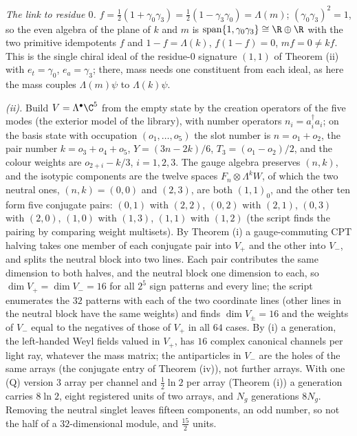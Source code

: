 \emph{The link to residue $0$.} $f = \tfrac12(1 + \gamma_{0}\gamma_{3}) = \tfrac12(1 - \gamma_{3}\gamma_{0}) = \Lambda(m)$; $(\gamma_{0}\gamma_{3})^{2} = 1$, so the even algebra of the plane of $k$ and $m$ is $\mathrm{span}\{1, \gamma_{0}\gamma_{3}\} \cong \R \oplus \R$ with the two primitive idempotents $f$ and $1 - f = \Lambda(k)$, $f(1 - f) = 0$, $mf = 0 \neq kf$. This is the single chiral ideal of the residue-$0$ signature $(1,1)$ of Theorem (ii) with $e_{t} = \gamma_{0}$, $e_{a} = \gamma_{3}$; there, mass needs one constituent from each ideal, as here the mass couples $\Lambda(m)\psi$ to $\Lambda(k)\psi$.

\emph{(ii).} Build $V = \Lambda^{\bullet}\C^{5}$ from the empty state by the creation operators of the five modes (the exterior model of the library), with number operators $n_{i} = a^{\dagger}_{i}a_{i}$; on the basis state with occupation $(o_{1}, \dots, o_{5})$ the slot number is $n = o_{1} + o_{2}$, the pair number $k = o_{3} + o_{4} + o_{5}$, $Y = (3n - 2k)/6$, $T_{3} = (o_{1} - o_{2})/2$, and the colour weights are $o_{2 + i} - k/3$, $i = 1, 2, 3$. The gauge algebra preserves $(n, k)$, and the isotypic components are the twelve spaces $F_{n} \otimes \Lambda^{k}W$, of which the two neutral ones, $(n, k) = (0, 0)$ and $(2, 3)$, are both $(1,1)_{0}$, and the other ten form five conjugate pairs: $(0,1)$ with $(2,2)$, $(0,2)$ with $(2,1)$, $(0,3)$ with $(2,0)$, $(1,0)$ with $(1,3)$, $(1,1)$ with $(1,2)$ (the script finds the pairing by comparing weight multisets). By Theorem (i) a gauge-commuting CPT halving takes one member of each conjugate pair into $V_{+}$ and the other into $V_{-}$, and splits the neutral block into two lines. Each pair contributes the same dimension to both halves, and the neutral block one dimension to each, so $\dim V_{+} = \dim V_{-} = 16$ for all $2^{5}$ sign patterns and every line; the script enumerates the $32$ patterns with each of the two coordinate lines (other lines in the neutral block have the same weights) and finds $\dim V_{\pm} = 16$ and the weights of $V_{-}$ equal to the negatives of those of $V_{+}$ in all $64$ cases. By (i) a generation, the left-handed Weyl fields valued in $V_{+}$, has $16$ complex canonical channels per light ray, whatever the mass matrix; the antiparticles in $V_{-}$ are the holes of the same arrays (the conjugate entry of Theorem (iv)), not further arrays. With one (Q) version 3 array per channel and $\tfrac12\ln 2$ per array (Theorem (i)) a generation carries $8\ln 2$, eight registered units of two arrays, and $N_{g}$ generations $8N_{g}$. Removing the neutral singlet leaves fifteen components, an odd number, so not the half of a $32$-dimensional module, and $\tfrac{15}{2}$ units.


